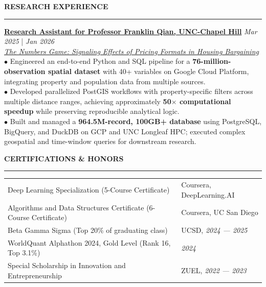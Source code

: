 \documentclass{../original_CV/resume}
\renewcommand{\sectionskip}{\vspace{0.10cm}}
\renewcommand{\sectionlineskip}{\vspace{0.10cm}}
\renewenvironment{rSection}[1]{
\sectionskip
\textcolor{UC San Diego Blue}{\textbf{\large\bfseries\MakeUppercase{#1}}}
\sectionlineskip
\hrule
\begin{list}{}{
\setlength{\leftmargin}{0em}
}
\item[]
}{
\end{list}
}
\begin{document}
\begin{rSection}{RESEARCH EXPERIENCE}
\noindent
\textbf{\href{https://github.com/YuankaiTao-super/Construction-of-Comparable-Housing-Variables}{Research Assistant for Professor Franklin Qian, UNC-Chapel Hill}} \hfill {\em Mar 2025} | {\em Jan 2026}\\
\textit{\href{https://papers.ssrn.com/sol3/papers.cfm?abstract_id=4406954}{The Numbers Game: Signaling Effects of Pricing Formats in Housing Bargaining}}\\[4pt]
$\bullet$ Engineered an end-to-end Python and SQL pipeline for a \textbf{76-million-observation spatial dataset} with 40+ variables on Google Cloud Platform, integrating property and population data from multiple sources.\\[1.5pt]
$\bullet$ Developed parallelized PostGIS workflows with property-specific filters across multiple distance ranges, achieving approximately \textbf{50$\times$ computational speedup} while preserving reproducible analytical logic.\\[1.5pt]
$\bullet$ Built and managed a \textbf{964.5M-record, 100GB+ database} using PostgreSQL, BigQuery, and DuckDB on GCP and UNC Longleaf HPC; executed complex geospatial and time-window queries for downstream research.
\end{rSection}

\begin{rSection}{CERTIFICATIONS \& HONORS}
\begin{tabularx}{\textwidth}{@{} >{\raggedright\arraybackslash}X >{\raggedleft\arraybackslash\hyphenpenalty=10000\exhyphenpenalty=10000}p{4.8cm} @{}}
Deep Learning Specialization (5-Course Certificate) & Coursera, DeepLearning.AI \\
Algorithms and Data Structures Certificate (6-Course Certificate) & Coursera, UC San Diego \\
Beta Gamma Sigma (Top 20\% of graduating class) & UCSD, {\em 2024 --- 2025} \\
WorldQuant Alphathon 2024, Gold Level (Rank 16, Top 3.1\%) & {\em 2024} \\
Special Scholarship in Innovation and Entrepreneurship & ZUEL, {\em 2022 --- 2023}
\end{tabularx}
\end{rSection}
\end{document}
